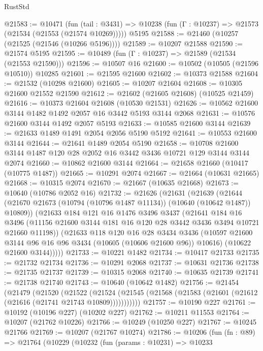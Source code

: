 \begin{lexlean}{RustStd}
\begin{coremodule}
@21583 := @10471
    (fun (tail : @3431) => @10238 (fun (Γ : @10237) => @21573 (@21534 (@21553 (@21574 @10269)))))
    @5195
@21588 := @21460 (@10257 (@21525 (@21546 (@10266 @5196))))
@21589 := @10207 @21588
@21590 := @21574 @5195
@21595 := @10489 (fun (Γ : @10237) => @21589 (@21534 (@21553 @21590)))
@21596 := @10507 @16
@21600 := @10502 (@10505 (@21596 @10510)) @10285
@21601 := @21595 @21600
@21602 := @10373 @21588
@21604 := @21532 (@10298 @21600)
@21605 := @10207 @21604
@21608 := @10305 @21600 @21552 @21590
@21612 := @21602 (@21605 @21608) (@10525 @21459)
@21616 := @10373 @21604 @21608 (@10530 @21531)
@21626 := @10562 @21600 @3144 @1482 @1492 @2057 @16 @3442 @5193 @3144 @2068
@21631 := @10576 @21600 @3144 @1492 @2057 @5193
@21633 := @10585 @21600 @3144
@21639 := @21633 @1489 @1491 @2054 @2056 @5190 @5192
@21641 := @10553 @21600 @3144
@21644 := @21641 @1489 @2054 @5190
@21658 := @10708 @21600 @3144 @1487 @120 @28 @2052 @16 @3442 @3436 @10721 @129 @3144 @3144 @2074
@21660 := @10862 @21600 @3144
@21664 := @21658 @21660 (@10417 (@10775 @1487))
@21665 := @10291 @2074
@21667 := @21664 (@10631 @21665)
@21668 := @10315 @2074
@21670 := @21667 (@10635 @21668)
@21673 := @10640 (@10786 @2052 @16)
@21732 := @21626
    (@21631
      (@21639
        (@21644 (@21670 @21673 (@10794 (@10796 @1487 @11134)) (@10640 (@10642 @1487)) @10809))
        (@21633
          @184
          @121
          @16
          @1476
          @3496
          @3437
          (@21641
            @184
            @16
            @3496
            (@11156 @21600 @3144 @181 @16 @120 @28 @3442 @3436 @3494 @10721 @21660 @11198))
          (@21633
            @118
            @120
            @16
            @28
            @3434
            @3436
            (@10597 @21600 @3144 @96 @16 @96 @3434 (@10605 (@10606 @21600 @96)) @10616)
            (@10622 @21600 @3144)))))
@21733 := @10221 @1482
@21734 := @10417 @21733
@21735 := @21732 @21734
@21736 := @10291 @2068
@21737 := @10631 @21736
@21738 := @21735 @21737
@21739 := @10315 @2068
@21740 := @10635 @21739
@21741 := @21738 @21740
@21743 := @10640 (@10642 @1482)
@21756 := @21454
    (@21479
      (@21520
        (@21522
          (@21524 (@21545 (@21568 (@21583 (@21601 (@21612 (@21616 (@21741 @21743 @10809)))))))))))
@21757 := @10190 @227
@21761 := @10192 (@10196 @227) (@10202 @227)
@21762 := @10211 @11553
@21764 := @10207 (@21762 @10226)
@21766 := @10249 (@10250 @227)
@21767 := @10245 @21766
@21769 := @10207 (@21767 @10274)
@21786 := @10206
    (fun (fn : @89) =>
    @21764
      (@10229
        (@10232
          (fun (params : @10231) =>
          @10233

\end{coremodule}
\end{lexlean}
